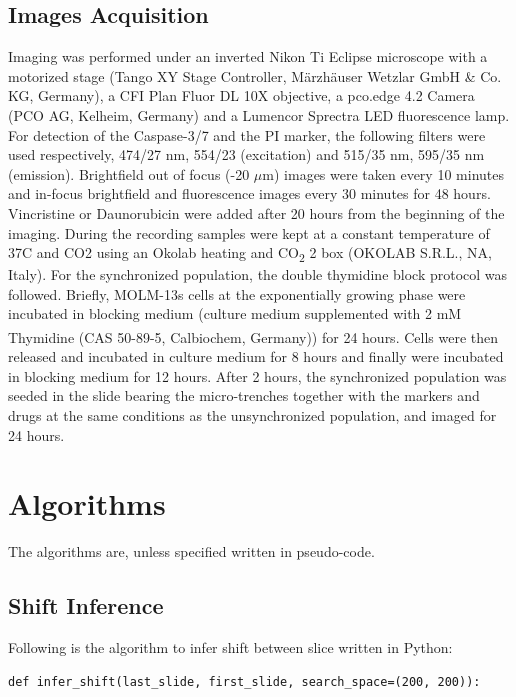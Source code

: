 \documentclass[pdftex,12pt,a4paper]{report}
\begin{document}
\begin{appendices}
\section{Images Acquisition}
\label{appendix:imageacquisition}

Imaging was performed under an inverted Nikon Ti Eclipse microscope with a motorized stage (Tango XY Stage Controller, M\"arzh\"auser Wetzlar GmbH \& Co. KG, Germany), a CFI Plan Fluor DL 10X objective, a pco.edge 4.2 Camera (PCO AG, Kelheim, Germany) and a Lumencor Sprectra LED fluorescence lamp. For detection of the Caspase-3/7 and the PI marker, the following filters were used respectively, 474/27 nm, 554/23 (excitation) and 515/35 nm, 595/35 nm (emission). Brightfield out of focus (-20 $\mu$m) images were taken every 10 minutes and in-focus  brightfield and fluorescence images every 30 minutes for 48 hours. Vincristine or Daunorubicin were added after 20 hours from the beginning of the imaging. During the recording samples were kept at a constant temperature of 37\degree C and CO2 using an Okolab heating and CO\textsubscript{2} 2 box (OKOLAB S.R.L., NA, Italy). For the synchronized population, the double thymidine block protocol was followed. Briefly, MOLM-13s cells at the exponentially growing phase were incubated in blocking medium (culture medium supplemented with 2 mM Thymidine (CAS 50-89-5, Calbiochem\textsuperscript{\textregistered}, Germany)) for 24 hours. Cells were then released and incubated in culture medium for 8 hours and finally were incubated in blocking medium for 12 hours. After 2 hours, the synchronized population was seeded in the slide bearing the micro-trenches together with the markers and drugs at the same conditions as the unsynchronized population, and imaged for 24 hours.

\chapter{Algorithms}\label{appendix:algo}

The algorithms are, unless specified written in pseudo-code.

\section*{Shift Inference} 

Following is the algorithm to infer shift between slice written in Python:

\begin{verbatim}
def infer_shift(last_slide, first_slide, search_space=(200, 200)):
    

\end{verbatim}
\end{appendices}
\end{document}
